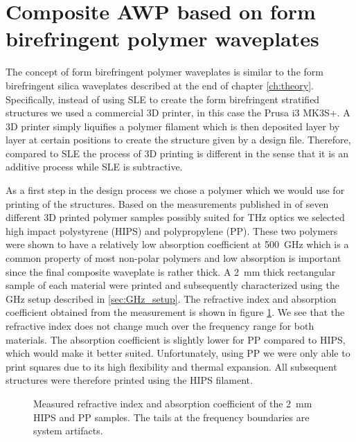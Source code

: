 \section{Composite AWP based on form birefringent polymer waveplates}
The concept of form birefringent polymer waveplates is similar to the form birefringent silica waveplates described at the end of chapter \ref{ch:theory}. Specifically, instead of using SLE to create the form birefringent stratified structures we used a commercial 3D printer, in this case the Prusa i3 MK3S+. A 3D printer simply liquifies a polymer filament which is then deposited layer by layer at certain positions to create the structure given by a design file. Therefore, compared to SLE the process of 3D printing is different in the sense that it is an additive process while SLE is subtractive.  

As a first step in the design process we chose a polymer which we would use for printing of the structures. Based on the measurements published in \cite{Busch2014} of seven different 3D printed polymer samples possibly suited for THz optics we selected high impact polystyrene (HIPS) and polypropylene (PP). These two polymers were shown to have a relatively low absorption coefficient at \SI{500}{\giga \hertz} which is a common property of most non-polar polymers \cite{Jordens2010, Castro-Camus2020} and low absorption is important since the final composite waveplate is rather thick. A \SI{2}{\milli \meter} thick rectangular sample of each material were printed and subsequently characterized using the GHz setup described in \ref{sec:GHz_setup}. The refractive index and absorption coefficient obtained from the measurement is shown in figure \ref{fig:HIPS_PP_ri}. We see that the refractive index does not change much over the frequency range for both materials. The absorption coefficient is slightly lower for PP compared to HIPS, which would make it better suited. Unfortunately, using PP we were only able to print squares due to its high flexibility and thermal expansion. All subsequent structures were therefore printed using the HIPS filament.

\begin{figure}[H]
    \centering
    
    \caption{Measured refractive index and absorption coefficient of the \SI{2}{\milli \meter} HIPS and PP samples. The tails at the frequency boundaries are system artifacts.}
    \label{fig:HIPS_PP_ri}
\end{figure}

